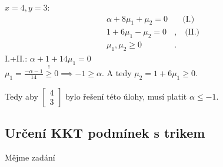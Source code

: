 $x=4, y=3$:
\begin{align*}
    \alpha + 8 \mu_1 + \mu_2 = 0& \quad \text{(I.)}\\
    1 + 6 \mu_1 - \mu_2 = 0&, \quad \text{(II.)}\\
    \mu_1, \mu_2 \geq 0&.
\end{align*}
I.+II.: $\alpha + 1 + 14 \mu_1 = 0$\\
$\mu_1 = \frac{-\alpha - 1}{14} \overset{!}{\geq} 0 \implies -1 \geq \alpha$. A tedy $\mu_2 = 1 + 6 \mu_1 \geq 0$.

Tedy aby
$\begin{bmatrix}
    4 \\
    3
\end{bmatrix}$ bylo řešení této úlohy, musí platit $\alpha \leq -1$.
\newpage
\subsection{Určení KKT podmínek s trikem}
Mějme zadání

